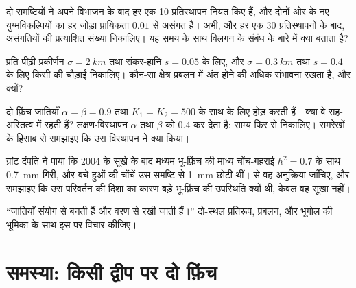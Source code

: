 \begin{exercise}[$\star\star$]\label{exo:b2:speciation:8}
दो समष्टियों ने अपने विभाजन के बाद हर एक 10 प्रतिस्थापन नियत किए हैं,
और दोनों ओर के नए युग्मविकल्पियों का हर जोड़ा प्रायिकता $0.01$ से
असंगत है। अभी, और हर एक 30 प्रतिस्थापनों के बाद, असंगतियों की
प्रत्याशित संख्या निकालिए। यह समय के साथ विलगन के संबंध के बारे में
क्या बताता है?
\end{exercise}

\begin{exercise}[$\star\star$]\label{exo:b2:speciation:9}
प्रति पीढ़ी प्रकीर्णन $\sigma =
\qty{2}{km}$ तथा संकर-हानि $s = 0.05$ के लिए, और
$\sigma = \qty{0.3}{km}$ तथा $s = 0.4$ के लिए किसी  की चौड़ाई निकालिए। कौन-सा क्षेत्र
प्रबलन में अंत होने की अधिक संभावना रखता है, और क्यों?
\end{exercise}

\begin{exercise}[$\star\star\star$]\label{exo:b2:speciation:10}
दो फ़िंच जातियाँ $\alpha = \beta = 0.9$ तथा
$K_1 = K_2 = 500$ के साथ  के लिए होड़ करती हैं। क्या वे सह-अस्तित्व में रहती हैं? लक्षण-विस्थापन
$\alpha$ तथा $\beta$ को $0.4$ कर देता है: साम्य फिर से निकालिए। समरेखों
के हिसाब से समझाइए कि उस विस्थापन ने क्या किया।
\end{exercise}

\begin{exercise}[$\star\star\star$]\label{exo:b2:speciation:11}
ग्रांट दंपति ने पाया कि 2004 के सूखे के बाद मध्यम भू-फ़िंच की
माध्य चोंच-गहराई $h^{2} = 0.7$ के साथ \qty{0.7}{mm} गिरी,
और बचे हुओं की चोंचें उस समष्टि से \qty{1}{mm} छोटी थीं।
 से वह अनुक्रिया जाँचिए, और
समझाइए कि उस परिवर्तन की दिशा का कारण बड़े भू-फ़िंच की उपस्थिति क्यों थी, केवल वह सूखा नहीं।
\end{exercise}

\begin{exercise}[$\star\star\star$]\label{exo:b2:speciation:12}
``जातियाँ संयोग से बनती हैं और वरण से रखी जाती हैं।'' दो-स्थल प्रतिरूप,
प्रबलन, और भूगोल की भूमिका के साथ इस पर विचार कीजिए।
\end{exercise}

\section{समस्या: किसी द्वीप पर दो फ़िंच}

